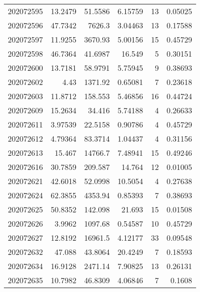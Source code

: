 \begin{tabular}{rrrrrr}
 202072595 &         13.2479  &       51.5586 &            6.15759 &          13 & 0.05025 \\
 202072596 &         47.7342  &     7626.3    &            3.04463 &          13 & 0.17588 \\
 202072597 &         11.9255  &     3670.93   &            5.00156 &          15 & 0.45729 \\
 202072598 &         46.7364  &       41.6987 &           16.549   &           5 & 0.30151 \\
 202072600 &         13.7181  &       58.9791 &            5.75945 &           9 & 0.38693 \\
 202072602 &          4.43    &     1371.92   &            0.65081 &           7 & 0.23618 \\
 202072603 &         11.8712  &      158.553  &            5.46856 &          16 & 0.44724 \\
 202072609 &         15.2634  &       34.416  &            5.74188 &           4 & 0.26633 \\
 202072611 &          3.97539 &       22.5158 &            0.90786 &           4 & 0.45729 \\
 202072612 &          4.79364 &       83.3714 &            1.04437 &           4 & 0.31156 \\
 202072613 &         15.467   &    14766.7    &            7.48941 &          15 & 0.49246 \\
 202072616 &         30.7859  &      209.587  &           14.764   &          12 & 0.01005 \\
 202072621 &         42.6018  &       52.0998 &           10.5054  &           4 & 0.27638 \\
 202072624 &         62.3855  &     4353.94   &            0.85393 &           7 & 0.38693 \\
 202072625 &         50.8352  &      142.098  &           21.693   &          15 & 0.01508 \\
 202072626 &          3.9962  &     1097.68   &            0.54587 &          10 & 0.45729 \\
 202072627 &         12.8192  &    16961.5    &            4.12177 &          33 & 0.09548 \\
 202072632 &         47.088   &       43.8064 &           20.4249  &           7 & 0.18593 \\
 202072634 &         16.9128  &     2471.14   &            7.90825 &          13 & 0.26131 \\
 202072635 &         10.7982  &       46.8309 &            4.06846 &           7 & 0.1608  \\

\end{tabular}
